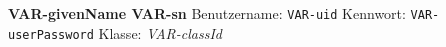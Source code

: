 \bigskip\textbf{\large VAR-givenName VAR-sn}\medskip
Benutzername: \texttt{VAR-uid}
Kennwort: \texttt{VAR-userPassword}\smallskip
Klasse: \textsl{VAR-classId}
~

